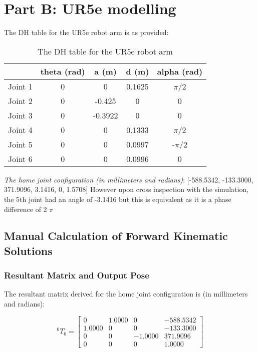 \section{Part B: UR5e modelling}

The DH table for the UR5e robot arm is as provided:
\begin{table}[H]
    \centering
    \begin{tabular}{|c|c|c|c|c|}
        \hline
                & \textbf{theta (rad)} & \textbf{a (m)} & \textbf{d (m)} & \textbf{alpha (rad)} \\ \hline
        Joint 1 & 0                    & 0              & 0.1625         & $\pi$/2              \\ \hline
        Joint 2 & 0                    & -0.425         & 0              & 0                    \\ \hline
        Joint 3 & 0                    & -0.3922        & 0              & 0                    \\ \hline
        Joint 4 & 0                    & 0              & 0.1333         & $\pi$/2              \\ \hline
        Joint 5 & 0                    & 0              & 0.0997         & -$\pi$/2             \\ \hline
        Joint 6 & 0                    & 0              & 0.0996         & 0                    \\ \hline
    \end{tabular}
    \caption{The DH table for the UR5e robot arm}
    \label{table:DH-UR5e default}
\end{table}

\textit{The home joint configuration (in  millimeters and radians)}: [-588.5342, -133.3000, 371.9096, 3.1416, 0, 1.5708]
However upon cross inspection with the simulation, the 5th joint had an angle of -3.1416 but this is equivalent as it is a phase difference of 2 $\pi$
\subsection{Manual Calculation of Forward Kinematic Solutions}
\subsubsection{Resultant Matrix and Output Pose}

The resultant matrix derived for the home joint configuration is (in millimeters and radians):

\begin{equation*}
    ^{0}T_{6} = \begin{bmatrix}
        0      & 1.0000 & 0       & -588.5342 \\
        1.0000 & 0      & 0       & -133.3000 \\
        0      & 0      & -1.0000 & 371.9096  \\
        0      & 0      & 0       & 1.0000
    \end{bmatrix}
\end{equation*}

